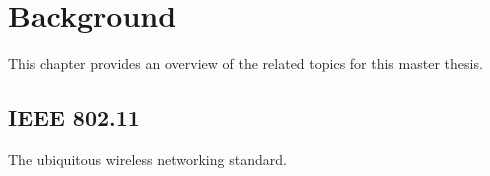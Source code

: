 \chapter{Background}

This chapter provides an overview of the related topics for this master thesis.

\section{IEEE 802.11}

The ubiquitous wireless networking standard.



